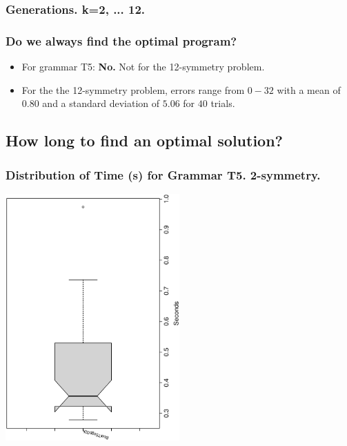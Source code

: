 \documentclass[18pt,c]{beamer}
\makeatletter
\let\beamer@writeslidentry@miniframeson=\beamer@writeslidentry
\newcommand*{\miniframeson}{\let\beamer@writeslidentry=\beamer@writeslidentry@miniframeson}
\makeatother
\begin{document}
 \begin{frame}
 \fontsize{8pt}{9pt}\selectfont
 \frametitle{ Generations. k=2, ... 12. }

 \label{ExpFStatsTable002.tex}  
 \end{frame}

\begin{frame}
\frametitle{
Do we always find the optimal program?
}
\begin{itemize}
\item For grammar T5: {\bf No.} Not for the 12-symmetry problem.
\item For the the 12-symmetry problem, errors range from $0-32$ 
       with a mean of $0.80$ and a standard deviation
       of $5.06$ for $40$ trials.
\end{itemize}
\end{frame}%
\miniframeson
\subsection{How long to find an optimal solution?}
 \begin{frame}
 \frametitle{ Distribution of Time (s) for Grammar T5. 2-symmetry. }
 \begin{center}
\includegraphics[width=0.5\textwidth, angle=-90]
{ExpFboxplottSeconds000.eps}
 \end{center}
 \label{ExpFboxplottSeconds000.eps}  
 \end{frame}
\end{document}
